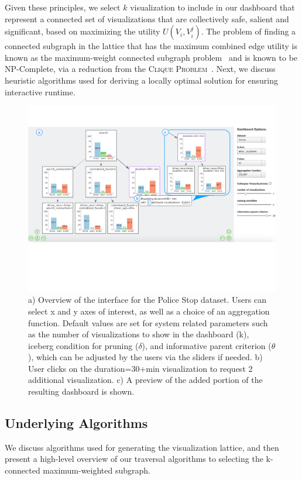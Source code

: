 Given these principles, we select $k$ visualization to include in our dashboard that represent a connected set of visualizations that are collectively safe, salient and significant, based on maximizing the utility $U(V_i, V_i^j)$. The problem of finding a connected subgraph in the lattice that has the maximum combined edge utility is known as the maximum-weight connected subgraph problem~\cite{ErnstAlthaus2009} and is known to be NP-Complete, via a reduction from the \textsc{Clique Problem}~\cite{Parameswaran2010}. Next, we discuss heuristic algorithms used for deriving a locally optimal solution for ensuring interactive runtime. 

\begin{figure}[ht!]
\centering
\includegraphics[width=0.8\linewidth,frame]{figures/overview_interface_expand.pdf}
\caption{a) Overview of the \system interface for the Police Stop dataset. Users can select x and y axes of interest, as well as a choice of an aggregation function. Default values are set for system related parameters such as the number of visualizations to show in the dashboard (k), iceberg condition for pruning ($\delta$), and informative parent criterion ($\theta$), which can be adjusted by the users via the sliders if needed. b) User clicks on the duration=30+min visualization to request 2 additional visualization. c) A preview of the added portion of the resulting dashboard is shown.}
\label{fig:overview}
\end{figure}

\subsection{Underlying Algorithms\label{sec:algorithms}}
We discuss algorithms used for generating the visualization lattice, and then present a high-level overview of our traversal algorithms to selecting the k-connected maximum-weighted subgraph.


